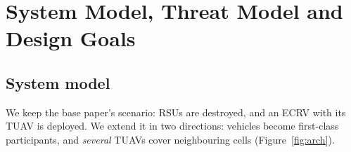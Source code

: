 \section{System Model, Threat Model and Design Goals}\label{sec:model}

\subsection{System model}
We keep the base paper's scenario: RSUs are destroyed, and an ECRV with its TUAV is deployed. We extend it in two directions: vehicles become
first-class participants, and \emph{several} TUAVs cover neighbouring cells (Figure~\ref{fig:arch}).

